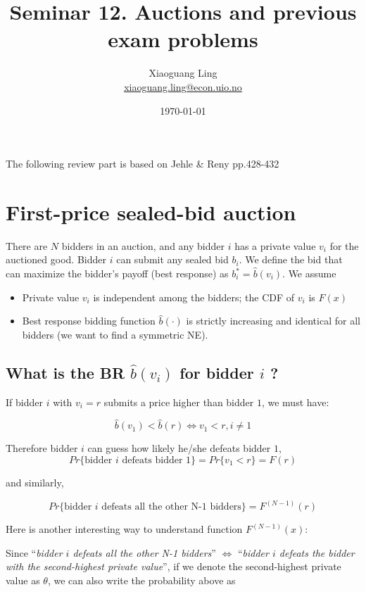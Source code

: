 \documentclass{article}
\title{Seminar 12. Auctions and previous exam problems}
\author{Xiaoguang Ling \\  \href{xiaoguang.ling@econ.uio.no}{xiaoguang.ling@econ.uio.no}}
\date{\today}
\begin{document}
\maketitle

\begin{mdframed}[backgroundcolor=blue!20,linecolor=white]

The following review part is based on Jehle \& Reny pp.428-432 

\section*{First-price sealed-bid auction}

There are $N$ bidders in an auction, and any bidder $i$ has a private value $v_i$ for the auctioned good. Bidder $i$ can submit any sealed bid $b_i$. We define the bid that can maximize the bidder's payoff (best response) as $b_i^* = \hat{b}(v_i)$. We assume
\begin{itemize}
\item Private value $v_i$ is independent among the bidders; the CDF of $v_i$ is $F(x)$
\item Best response bidding function $\hat{b}(\cdot)$ is strictly increasing and identical for all bidders (we want to find a symmetric NE).
\end{itemize}

\subsection*{What is the BR $\hat{b}(v_i)$ for bidder $i$ ?}

If bidder $i$ with $v_i=r$ submits a price higher than bidder $1$, we must have:

$$\hat{b}(v_1) < \hat{b}(r) \iff v_1  < r, i \neq 1
$$

\medskip

Therefore bidder $i$ can guess how likely he/she defeats bidder $1$, $$Pr\{\text{bidder $i$ defeats bidder 1}\} = Pr\{v_1  < r\} = F(r)$$

and similarly,

$$Pr\{\text{bidder $i$ defeats all the other N-1 bidders}\} = F^{(N-1)}(r)$$


Here is another interesting way to understand function $F^{(N-1)}(x)$:

\smallskip 

Since ``\textit{bidder $i$ defeats all the other N-1 bidders}'' $\iff$ ``\textit{bidder $i$ defeats the bidder with the second-highest private value}'', if we denote the second-highest private value as $\theta$, we can also write the probability above as


\end{mdframed}
\end{document}
